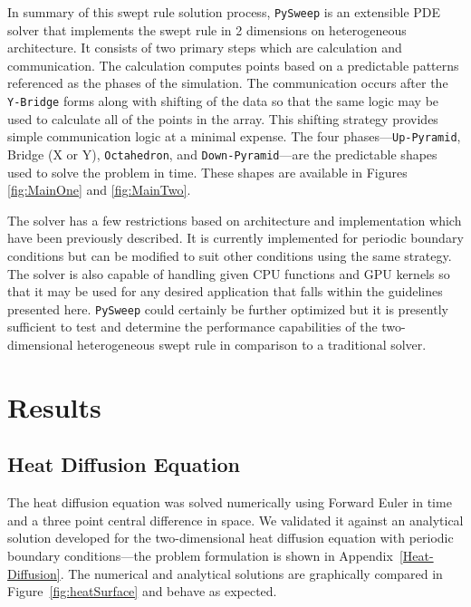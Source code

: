 \documentclass[preprints,article,accept,moreauthors,pdftex]{Definitions/mdpi}
\def\pysweep{\texttt{PySweep}}
\def\Up{\texttt{Up-Pyramid}}
\def\Down{\texttt{Down-Pyramid}}
\def\Oct{\texttt{Octahedron}}
\def\Yb{\texttt{Y-Bridge}}
\begin{document}
\par
In summary of this swept rule solution process, \pysweep{} is an extensible PDE solver that implements the swept rule in 2 dimensions on heterogeneous architecture. It consists of two primary steps which are calculation and communication. The calculation computes points based on a predictable patterns referenced as the phases of the simulation. The communication occurs after the \Yb{} forms along with shifting of the data so that the same logic may be used to calculate all of the points in the array. This shifting strategy provides simple communication logic at a minimal expense. The four phases---\Up{}, Bridge (X or Y), \Oct{}, and \Down{}---are the predictable shapes used to solve the problem in time. These shapes are available in Figures \ref{fig:MainOne} and \ref{fig:MainTwo}. 
\par
The solver has a few restrictions based on architecture and implementation which have been previously described. It is currently implemented for periodic boundary conditions but can be modified to suit other conditions using the same strategy. The solver is also capable of handling given CPU functions and GPU kernels so that it may be used for any desired application that falls within the guidelines presented here. \pysweep{} could certainly be further optimized but it is presently sufficient to test and determine the performance capabilities of the two-dimensional heterogeneous swept rule in comparison to a traditional solver.

\section{Results}
\label{results-section}

\subsection{Heat Diffusion Equation}
\label{hdeResults}
The heat diffusion equation was solved numerically using Forward Euler in time and a three point central difference in space. We validated it against an analytical solution developed for the two-dimensional heat diffusion equation with periodic boundary conditions---the problem formulation is shown in Appendix~\ref{Heat-Diffusion}. The numerical and analytical solutions are graphically compared in Figure~\ref{fig:heatSurface} and behave as expected.
\end{document}
